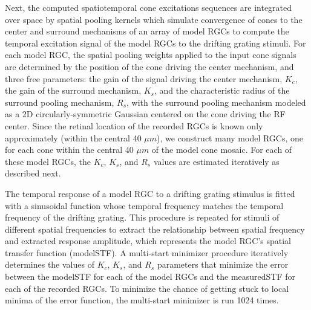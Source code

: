 \documentclass[11pt, oneside]{article}   	%
\begin{document}
Next, the computed spatiotemporal cone excitations sequences are integrated over space by spatial pooling kernels which simulate convergence of cones to the center and surround mechanisms of an array of model RGCs to compute the temporal excitation signal of the model RGCs to the drifting grating stimuli. For each model RGC, the spatial pooling weights applied to the input cone signals are determined by the position of the cone driving the center mechanism, and three free parameters: the gain of the signal driving the center mechanism, $K_c$, the gain of the surround mechanism, $K_s$, and the characteristic radius of the surround pooling mechanism, $R_s$, with the surround pooling mechanism modeled as a 2D circularly-symmetric Gaussian centered on the cone driving the RF center. Since the retinal location of the recorded RGCs is known only approximately (within the central 40 $\mu m$), we construct many model RGCs, one for each cone within the central 40 $\mu m$ of the model cone mosaic. For each of these model RGCs, the $K_c$, $K_s$, and $R_s$ values are estimated iteratively as described next. 

The temporal response of a model RGC to a drifting grating stimulus is fitted with a sinusoidal function whose temporal frequency matches the temporal frequency of the drifting grating. This procedure is repeated for stimuli of different spatial frequencies to extract the relationship between spatial frequency and extracted response amplitude, which represents the model RGC's spatial transfer function (modelSTF). A multi-start minimizer procedure iteratively determines the values of $K_c$, $K_s$, and $R_s$ parameters that minimize the error between the modelSTF for each of the model RGCs and the measuredSTF for each of the recorded RGCs. To minimize the chance of getting stuck to local minima of the error function, the multi-start minimizer is run 1024 times.
\end{document}
